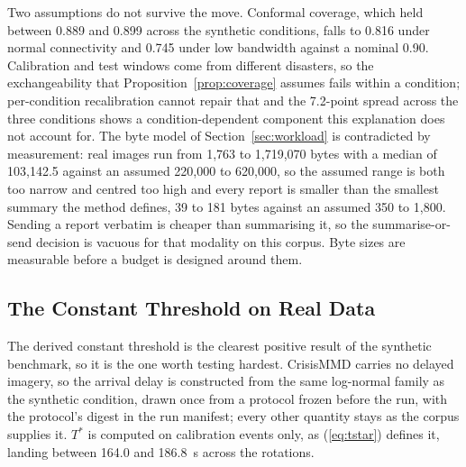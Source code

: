 \documentclass[conference,a4paper]{IEEEtran}
\begin{document}
Two assumptions do not survive the move. Conformal coverage, which held between 0.889 and 0.899 across the synthetic conditions, falls to 0.816 under normal connectivity and 0.745 under low bandwidth against a nominal 0.90. Calibration and test windows come from different disasters, so the exchangeability that Proposition~\ref{prop:coverage} assumes fails within a condition; per-condition recalibration cannot repair that and the 7.2-point spread across the three conditions shows a condition-dependent component this explanation does not account for. The byte model of Section~\ref{sec:workload} is contradicted by measurement: real images run from 1,763 to 1,719,070 bytes with a median of 103,142.5 against an assumed 220,000 to 620,000, so the assumed range is both too narrow and centred too high and every report is smaller than the smallest summary the method defines, 39 to 181 bytes against an assumed 350 to 1,800. Sending a report verbatim is cheaper than summarising it, so the summarise-or-send decision is vacuous for that modality on this corpus. Byte sizes are measurable before a budget is designed around them.

\subsection{The Constant Threshold on Real Data}
\label{sec:realthreshold}
The derived constant threshold is the clearest positive result of the synthetic benchmark, so it is the one worth testing hardest. CrisisMMD carries no delayed imagery, so the arrival delay is constructed from the same log-normal family as the synthetic condition, drawn once from a protocol frozen before the run, with the protocol's digest in the run manifest; every other quantity stays as the corpus supplies it. $T^\ast$ is computed on calibration events only, as (\ref{eq:tstar}) defines it, landing between 164.0 and 186.8~s across the rotations.
\end{document}
